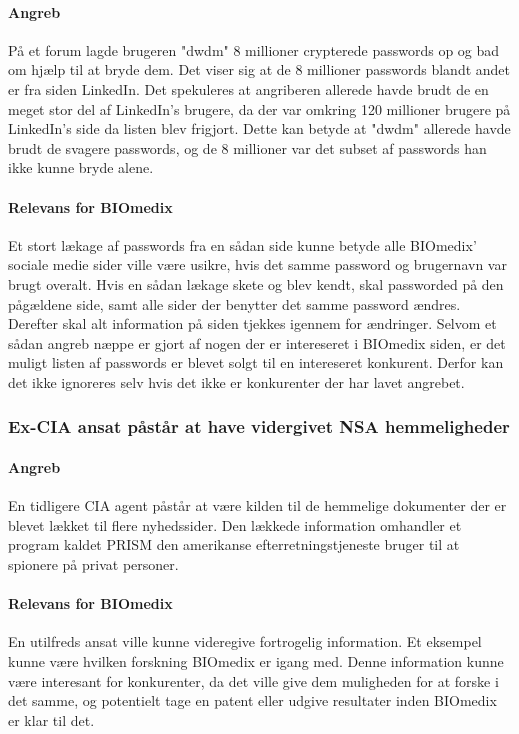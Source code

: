 \documentclass{article}
\begin{document}
\paragraph{Angreb}
På et forum lagde brugeren "dwdm" 8 millioner crypterede passwords op og bad om hjælp
til at bryde dem. Det viser sig at de 8 millioner passwords blandt andet er fra siden LinkedIn.
Det spekuleres at angriberen allerede havde brudt de en meget stor del af LinkedIn's brugere, da
der var omkring 120 millioner brugere på LinkedIn's side da listen blev frigjort. Dette kan betyde
at "dwdm" allerede havde brudt de svagere passwords, og de 8 millioner var det subset af passwords
han ikke kunne bryde alene\cite{LinkedInStory}.

\paragraph{Relevans for BIOmedix}

Et stort lækage af passwords fra en sådan side kunne betyde alle BIOmedix'
sociale medie sider ville være usikre, hvis det samme password og brugernavn var 
brugt overalt.
Hvis en sådan lækage skete og blev kendt, skal passworded på den pågældene side, samt
alle sider der benytter det samme password ændres. Derefter skal alt information på
siden tjekkes igennem for ændringer.
Selvom et sådan angreb næppe er gjort af nogen der er intereseret i BIOmedix siden, er
det muligt listen af passwords er blevet solgt til en intereseret konkurent. Derfor kan
det ikke ignoreres selv hvis det ikke er konkurenter der har lavet angrebet.

\subsubsection{Ex-CIA ansat påstår at have vidergivet NSA hemmeligheder} 

\paragraph{Angreb}
En tidligere CIA agent påstår at være kilden til de hemmelige dokumenter der er blevet
lækket til flere nyhedssider. Den lækkede information omhandler et program kaldet PRISM 
den amerikanse efterretningstjeneste bruger til at spionere på privat personer\cite{CIAStory}.

\paragraph{Relevans for BIOmedix}
En utilfreds ansat ville kunne videregive fortrogelig information. Et eksempel kunne være hvilken
forskning BIOmedix er igang med. Denne information kunne være interesant for konkurenter, da det ville
give dem muligheden for at forske i det samme, og potentielt tage en patent eller udgive resultater
inden BIOmedix er klar til det.
\end{document}
